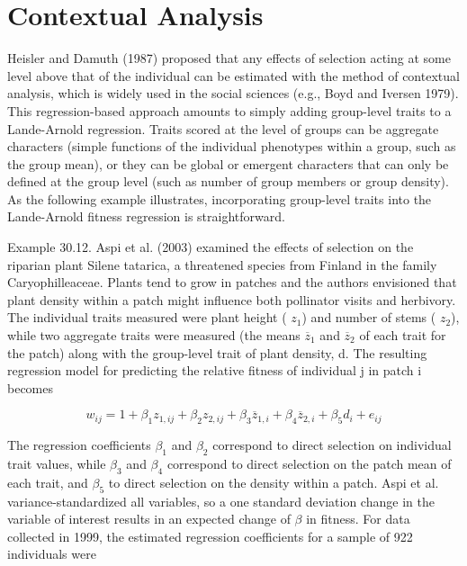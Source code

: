\documentclass{article}
\begin{document}
\section{Contextual Analysis}
Heisler and Damuth (1987) proposed that any effects of selection acting at some level above that of the individual can be estimated with the method of contextual analysis, which is widely used in the social sciences (e.g., Boyd and Iversen 1979). This regression-based approach amounts to simply adding group-level traits to a Lande-Arnold regression. Traits scored at the level of groups can be aggregate characters (simple functions of the individual phenotypes within a group, such as the group mean), or they can be global or emergent characters that can only be defined at the group level (such as number of group members or group density). As the following example illustrates, incorporating group-level traits into the Lande-Arnold fitness regression is straightforward.

Example 30.12. Aspi et al. (2003) examined the effects of selection on the riparian plant Silene tatarica, a threatened species from Finland in the family Caryophilleaceae. Plants tend to grow in patches and the authors envisioned that plant density within a patch might influence both pollinator visits and herbivory. The individual traits measured were plant height ( $ z_{1} $) and number of stems ( $ z_{2} $), while two aggregate traits were measured (the means  $ \overline{z}_{1} $ and  $ \overline{z}_{2} $ of each trait for the patch) along with the group-level trait of plant density, d. The resulting regression model for predicting the relative fitness of individual j in patch i becomes

\begin{equation}
w_{ij}=1+\beta_{1}z_{1,ij}+\beta_{2}z_{2,ij}+\beta_{3}\overline{z}_{1,i}+\beta_{4}\overline{z}_{2,i}+\beta_{5}d_{i}+e_{ij}
\end{equation}

The regression coefficients  $ \beta_1 $ and  $ \beta_2 $ correspond to direct selection on individual trait values, while  $ \beta_3 $ and  $ \beta_4 $ correspond to direct selection on the patch mean of each trait, and  $ \beta_5 $ to direct selection on the density within a patch. Aspi et al. variance-standardized all variables, so a one standard deviation change in the variable of interest results in an expected change of  $ \beta $ in fitness. For data collected in 1999, the estimated regression coefficients for a sample of 922 individuals were
\end{document}
